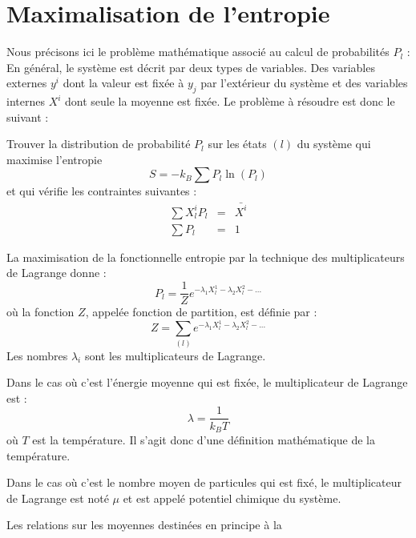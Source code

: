 \documentclass[12pt]{book}
\begin{document}
\section{Maximalisation de l'entropie}\label{secmaxient}
Nous pr\'ecisons ici le probl\`eme math\'ematique associ\'e au calcul
de probabilit\'es $P_l$ :
En g\'en\'eral, le syst\`eme est d\'ecrit par deux types de
variables. Des variables externes $y^i$ dont la valeur est fix\'ee \`a
$y_j$ par l'ext\'erieur du syst\`eme et des variables internes $X^i$
dont seule la moyenne est fix\'ee.
Le probl\`eme \`a r\'esoudre est donc le suivant : 
\begin{prob}
Trouver la distribution de probabilit\'e $P_l$ sur les \'etats $(l)$ du
syst\`eme qui maximise l'entropie
\begin{equation}
S=-k_B\sum P_l \ln (P_l)
\end{equation}
et qui v\'erifie les contraintes suivantes :
\begin{eqnarray}
\sum X_{l}^iP_l&=&\bar{X^i}\\
\sum P_l&=&1
\end{eqnarray}
\end{prob}
La maximisation de la fonctionnelle entropie par la technique des
multiplicateurs de Lagrange donne :
\begin{equation}
P_l=\frac{1}{Z}e^{-\lambda_1 X^{1}_l-\lambda_2 X^{2}_l- ...}
\end{equation}
o\`u  la fonction $Z$, appel\'ee fonction de partition,
 est d\'efinie par :
\begin{equation}
Z=\sum_{(l)} e^{-\lambda_1 X^{1}_l-\lambda_2 X^{2}_l- ...}
\end{equation}
Les nombres $\lambda_i$ sont les multiplicateurs de Lagrange.
\begin{exmp}
Dans le cas o\`u c'est l'\'energie moyenne qui est fix\'ee, le
multiplicateur de Lagrange est :
\begin{equation}
\lambda=\frac{1}{k_BT}
\end{equation}
o\`u $T$ est la temp\'erature. Il s'agit donc
d'une d\'efinition 
math\'ematique de la temp\'erature.
\end{exmp}
\begin{exmp}
Dans le cas o\`u c'est le nombre moyen de particules qui est fix\'e, le
multiplicateur de Lagrange est not\'e $\mu$ et est appel\'e potentiel
chimique du syst\`eme.
\end{exmp}
Les relations sur les moyennes destin\'ees en principe \`a la
\end{document}
